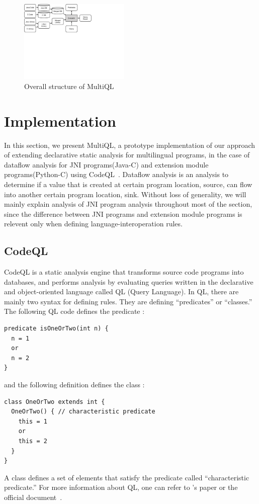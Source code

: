 \begin{figure}[t]
  \centering
  \vspace{2mm}
  \includegraphics[width=0.47\textwidth]{img/codeql.pdf}
  \caption{Overall structure of MultiQL}
  \label{fig:codeql}
\end{figure}

\section{Implementation}\label{sec:impl}
In this section, we present MultiQL, a prototype implementation of our
approach of extending declarative static analysis for multilingual programs,
in the case of dataflow analysis for JNI programs(Java-C)
and extension module programs(Python-C) using CodeQL~\cite{codeql}.
Dataflow analysis is an analysis to determine if a value that is created at
certain program location, source, can flow into another certain program location, sink.
Without loss of generality, we will mainly explain analysis of JNI program
analysis throughout most of the section, since the difference between JNI programs and
extension module programs is relevent only when defining
language-interoperation rules.



\subsection{CodeQL}
CodeQL is a static analysis engine that transforms source code programs into
databases, and performs analysis by evaluating queries written in the
declarative and object-oriented language called QL (Query Language).
In QL, there are mainly two syntax for defining rules.
They are defining ``predicates'' or ``classes.''
The following QL code defines the predicate :
\begin{lstlisting}[style=codeql,xleftmargin=2.5em]
predicate isOneOrTwo(int n) {
  n = 1
  or
  n = 2
}
\end{lstlisting}
and the following definition defines the class :
\begin{lstlisting}[style=codeql,xleftmargin=2.5em]
class OneOrTwo extends int {
  OneOrTwo() { // characteristic predicate
    this = 1
    or
    this = 2
  }
}
\end{lstlisting}
A class defines a set of elements that satisfy the predicate called
``characteristic predicate.''
For more information about QL, one can refer to \citet{ql2016}'s paper
or the official document~\cite{codeql}.

